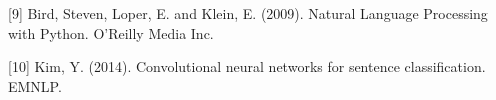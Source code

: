 \documentclass{article} %
\begin{document}
{[9] Bird, Steven, Loper, E. and Klein, E. (2009). Natural Language Processing with Python. O'Reilly Media Inc.

[10] Kim, Y. (2014). Convolutional neural networks for sentence classification. EMNLP.



%
%



}
\end{document}
